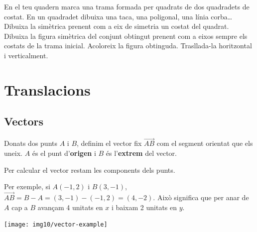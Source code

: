 \begin{mylist}

\exer  En el teu quadern marca una trama formada per quadrats de dos quadradets de costat. En un quadradet dibuixa una taca, una poligonal, una línia corba{\dots} Dibuixa la simètrica prenent com a eix de simetria un costat del quadrat. Dibuixa la figura simètrica del conjunt obtingut prenent com a eixos sempre els costats de la trama inicial. Acoloreix la figura obtinguda. Trasllada-la horitzontal i verticalment.


\end{mylist}
 
\section{Translacions}
\vspace{-0.25cm}
\subsection{Vectors}
\vspace{-0.25cm}
\begin{theorybox}
	\begin{minipage}{0.6\textwidth}
			Donats dos punts $A$ i $B$, definim el vector fix $\overrightarrow{AB}$ com el segment orientat que els uneix. $A$ és el punt d'\textbf{origen} i $B$ és l'\textbf{extrem} del vector.
		
		Per calcular el vector restam les components dels punts. 
		
		Per exemple, si $A(-1, 2)$ i $B(3, -1)$, $\overrightarrow{AB}=B-A =(3, -1)-(-1, 2)=(4, -2)$. Això significa que per anar de $A$ cap a $B$ avançam 4 unitats en $x$ i baixam 2 unitats en $y$.
	\end{minipage}
\begin{minipage}{0.4\textwidth}
	\centering
	\texttt{[image: img10/vector-example]}
\end{minipage}

\end{theorybox}

